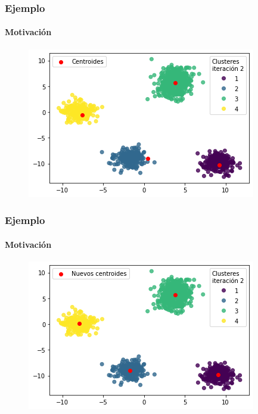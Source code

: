 \documentclass[
  shownotes,
  xcolor={svgnames},
  hyperref={colorlinks,citecolor=DarkBlue,linkcolor=DarkRed,urlcolor=DarkBlue}
  , aspectratio=169]{beamer}
\begin{document}
\begin{frame}
\frametitle{Ejemplo}
\framesubtitle{Motivación}


\begin{figure}[H] \centering

    \centering
    \includegraphics[scale=.7]{figures/output_17_1.png}
  \\
  \tiny
\end{figure}

\end{frame}
\begin{frame}
\frametitle{Ejemplo}
\framesubtitle{Motivación}


\begin{figure}[H] \centering

    \centering
    \includegraphics[scale=.7]{figures/output_17_2.png}
  \\
  \tiny
\end{figure}

\end{frame}
\end{document}
